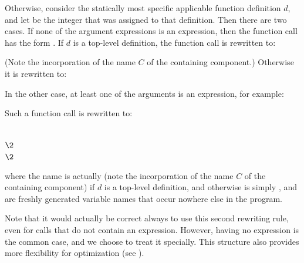 Otherwise, consider the statically most specific applicable function
definition $d$, and let  be the integer that was assigned to that definition.
Then there are two cases.  If none of the
argument expressions is an  expression, then the function call
has the form .
If $d$ is a top-level definition, the function call is rewritten to:
\begin{codeexamplesize}
\begin{tabbing}
\end{tabbing}
\end{codeexamplesize}
(Note the incorporation of the name $C$ of the containing component.)  Otherwise it is rewritten to:
\begin{codeexamplesize}
\begin{tabbing}
\end{tabbing}
\end{codeexamplesize}

In the other case, at least one of the arguments is an  expression, for example:
\begin{codeexamplesize}
\begin{tabbing}
\end{tabbing}
\end{codeexamplesize}
Such a function call is rewritten to:
\begin{codeexamplesize}
\begin{tabbing}
 \\
\(\2\) \\
\(\2\) \\
\end{tabbing}
\end{codeexamplesize}
where the name  is actually 
(note the incorporation of the name $C$ of the containing component)
if $d$ is a top-level definition, and otherwise is simply ,
and  are freshly generated variable names
that occur nowhere else in the program.

Note that it would actually be correct always to use this second rewriting rule,
even for calls that do not contain an  expression.  However,
having no  expression is the common case, and we choose to treat
it specially.  This structure also provides more flexibility for optimization
(see ).




